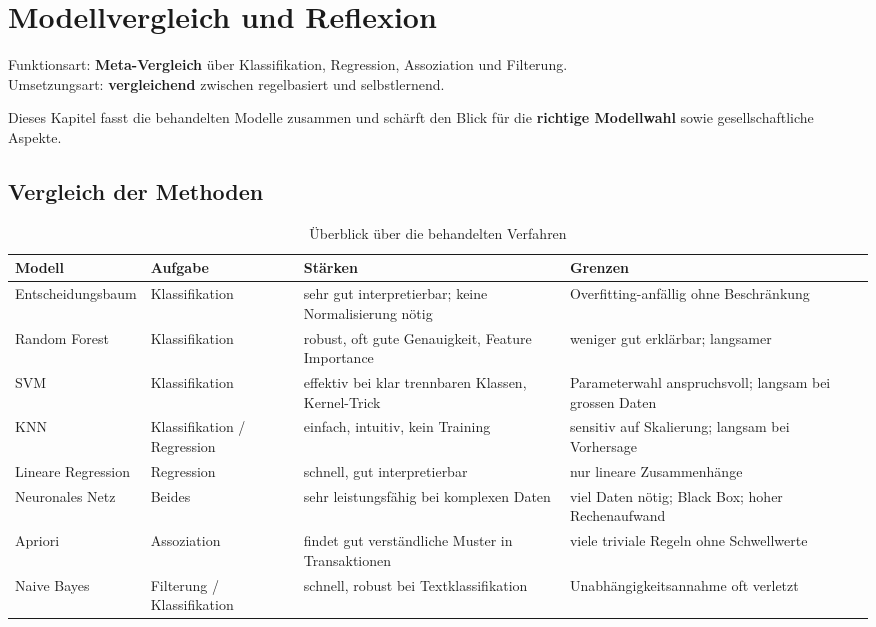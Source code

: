 \chapter{Modellvergleich und Reflexion}
\label{chap:modellvergleich}

\begin{myremark}
Funktionsart: \textbf{Meta-Vergleich} über Klassifikation, Regression, Assoziation und Filterung. \\
Umsetzungsart: \textbf{vergleichend} zwischen regelbasiert und selbstlernend.
\end{myremark}

\begin{myremark}
Dieses Kapitel fasst die behandelten Modelle zusammen und schärft den Blick für
die \textbf{richtige Modellwahl} sowie gesellschaftliche Aspekte.
\end{myremark}

\section{Vergleich der Methoden}

\begin{table}[H]
\centering
\small
\begin{tabular}{p{2.8cm}p{2.1cm}p{3.5cm}p{3.5cm}}
\toprule
\textbf{Modell} & \textbf{Aufgabe} & \textbf{Stärken} & \textbf{Grenzen} \\
\midrule
Entscheidungsbaum & Klassifikation & sehr gut interpretierbar; keine Normalisierung nötig & Overfitting-anfällig ohne Beschränkung \\
\midrule
Random Forest & Klassifikation & robust, oft gute Genauigkeit, Feature Importance & weniger gut erklärbar; langsamer \\
\midrule
SVM & Klassifikation & effektiv bei klar trennbaren Klassen, Kernel-Trick & Parameterwahl anspruchsvoll; langsam bei grossen Daten \\
\midrule
KNN & Klassifikation / Regression & einfach, intuitiv, kein Training & sensitiv auf Skalierung; langsam bei Vorhersage \\
\midrule
Lineare Regression & Regression & schnell, gut interpretierbar & nur lineare Zusammenhänge \\
\midrule
Neuronales Netz & Beides & sehr leistungsfähig bei komplexen Daten & viel Daten nötig; Black Box; hoher Rechenaufwand \\
\midrule
Apriori & Assoziation & findet gut verständliche Muster in Transaktionen & viele triviale Regeln ohne Schwellwerte \\
\midrule
Naive Bayes & Filterung / Klassifikation & schnell, robust bei Textklassifikation & Unabhängigkeitsannahme oft verletzt \\
\bottomrule
\end{tabular}
\caption{Überblick über die behandelten Verfahren}
\label{tab:modellvergleich-15}
\end{table}

